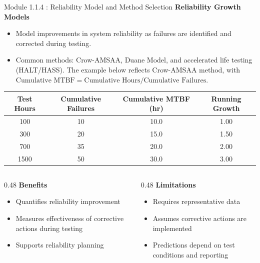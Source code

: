\documentclass{beamer}
\begin{document}
\begin{frame}{Module 1.1.4 : Reliability Model and Method Selection}
\scriptsize
\textbf{Reliability Growth Models}
\begin{itemize}
\scriptsize
\item Model improvements in system reliability as failures are identified and corrected during testing.
\item Common methods: Crow-AMSAA, Duane Model, and accelerated life testing (HALT/HASS).  The example below reflects Crow-AMSAA method, with $\text{Cumulative MTBF} = \text{Cumulative Hours}/\text{Cumulative Failures}$.
\end{itemize}
\begin{center}
\begin{tabular}{|c|c|c|c|}
\hline
\textbf{Test Hours} & \textbf{Cumulative Failures} & \textbf{Cumulative MTBF (hr)} & \textbf{Running Growth} \\
\hline
100  & 10 & 10.0 & 1.00 \\
300  & 20 & 15.0 & 1.50 \\
700  & 35 & 20.0 & 2.00 \\
1500 & 50 & 30.0 & 3.00 \\
\hline
\end{tabular}
\end{center}
\vspace{0.25cm}
\begin{columns}[T]
\begin{column}{0.48\textwidth}
\textbf{Benefits}
\begin{itemize}
\item Quantifies reliability improvement
\item Measures effectiveness of corrective actions during testing
\item Supports reliability planning
\end{itemize}
\end{column}
\begin{column}{0.48\textwidth}
\textbf{Limitations}
\begin{itemize}
\item Requires representative data
\item Assumes corrective actions are implemented
\item Predictions depend on test conditions and reporting
\end{itemize}
\end{column}
\end{columns}
\end{frame}
\end{document}
